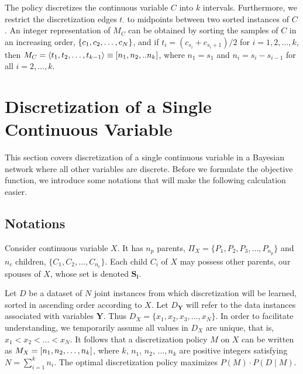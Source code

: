 \noindent
The policy discretizes the continuous variable $C$ into $k$ intervals. Furthermore, we restrict the discretization edges $t_\cdot$ to midpoints between two sorted instances of $C$. An integer representation of $M_C$ can be obtained by sorting the samples of $C$ in an increasing order, $\curly{c_1,c_2,\ldots,c_N}$, and if $t_i = (c_{s_{i}} + c_{s_{i}+1})/2$ for $i=1,2,\ldots,k$, then $M_C = \anglebrackets{t_1,t_2, \ldots, t_{k-1}} \equiv \brock{n_1,n_2,..n_k}$, where $n_1 = s_1$ and $n_i = s_{i} - s_{i-1}$ for all $i = 2,\ldots,k$.


\section{Discretization of a Single Continuous Variable}
\label{sec:single_var}

This section covers discretization of a single continuous variable in a Bayesian network where all other variables are discrete.
Before we formulate the objective function, we introduce some notations that will make the following calculation easier.

\subsection{Notations}



Consider continuous variable $X$.
It has $n_p$ parents, $\Pi_X = \{ P_1, P_2, P_3,\ldots,P_{n_p}\}$ and $n_c$ children, $\{ C_1, C_2,\ldots,C_{n_c}\}$.
Each child $C_i$ of $X$ may possess other parents, our spouses of $X$, whose set is denoted $\boldsymbol{S_i}$.

Let $D$ be a dataset of $N$ joint instances from which discretization will be learned, sorted in ascending order according to $X$.
Let $D_{\boldsymbol{Y}}$ will refer to the data instances associated with variables $\boldsymbol{Y}$.
Thus $D_X = \{ x_1,x_2,x_3,\ldots,x_N \}$.
In order to facilitate understanding, we temporarily assume all values in $D_X$ are unique, that is, $x_1 < x_2 < \ldots < x_N$.
It follows that a discretization policy $M$ on $X$ can be written as $M_X = \brock{n_1,n_2,\ldots,n_k}$, where $k$, $n_1$, $n_2$, $\ldots,n_k$ are positive integers satisfying $N = \sum_{i=1}^k n_i$.
The optimal discretization policy maximizes $P(M)\cdot P(D\mid M)$.

